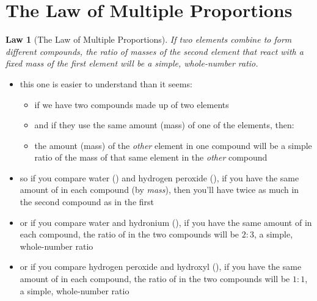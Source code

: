 \documentclass[11pt, oneside]{article}   	%
\newtheorem{law}{Law}
\begin{document}
\section{The Law of Multiple Proportions}

\begin{law}[The Law of Multiple Proportions]\label{law-multiple-proportions}
If two elements combine to form different compounds, the ratio of masses of the \emph{second} element that react with a fixed mass of the \emph{first} element 
will be a simple, whole-number ratio.
\end{law}

\begin{itemize}
\item this one is easier to understand than it seems:
\begin{itemize}
\item if we have two compounds made up of two elements
\item and if they use the same amount (mass) of one of the elements, then:
\item the amount (mass) of the \emph{other} element in one compound will be a simple ratio of the mass of that same element in the \emph{other} compound
\end{itemize}
\item so if you compare water () and hydrogen peroxide (), if you have the same amount of  in each compound (by \emph{mass}), then you'll have twice as much  in the second compound as in the first
\item or if you compare water and hydronium (), if you have the same amount of  in each compound, the ratio of  in the two compounds will be $2:3$, a simple, whole-number ratio 
\item or if you compare hydrogen peroxide and hydroxyl (), if you have the same amount of  in each compound, the ratio of  in the two compounds will be $1:1$, a simple, whole-number ratio 
\end{itemize}
\end{document}

